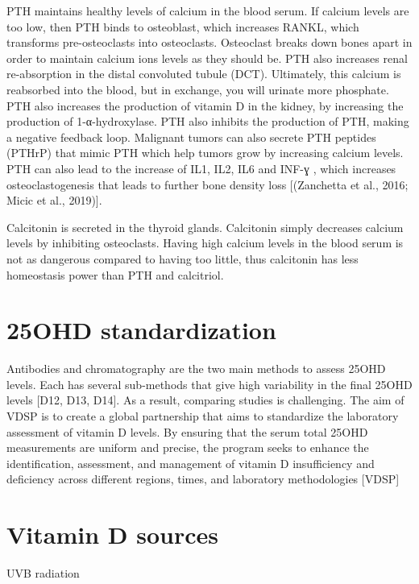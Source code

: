 PTH maintains healthy levels of calcium in the blood serum. If calcium levels are too low, then PTH binds to osteoblast, which increases RANKL, which transforms pre-osteoclasts into osteoclasts. Osteoclast breaks down bones apart in order to maintain calcium ions levels as they should be. PTH also increases renal re-absorption in the distal convoluted tubule (DCT). Ultimately, this calcium is reabsorbed into the blood, but in exchange, you will urinate more phosphate. PTH also increases the production of vitamin D in the kidney, by increasing the production of 1-α-hydroxylase. PTH also inhibits the production of PTH, making a negative feedback loop. Malignant tumors can also secrete PTH peptides (PTHrP) that mimic PTH which help tumors grow by increasing calcium levels. PTH can also lead to the increase of IL1, IL2, IL6 and INF-ɣ , which increases osteoclastogenesis that leads to further bone density loss [(Zanchetta et al., 2016; Micic et al., 2019)]. 

Calcitonin is secreted in the thyroid glands. Calcitonin simply decreases calcium levels by inhibiting osteoclasts. Having high calcium levels in the blood serum is not as dangerous compared to having too little, thus calcitonin has less homeostasis power than PTH and calcitriol. 


\section{25OHD standardization}

Antibodies and chromatography are the two main methods to assess 25OHD levels. Each has several sub-methods that give high variability in the final 25OHD levels [D12, D13, D14]. As a result, comparing studies is challenging. The aim of VDSP is to create a global partnership that aims to standardize the laboratory assessment of vitamin D levels. By ensuring that the serum total 25OHD measurements are uniform and precise, the program seeks to enhance the identification, assessment, and management of vitamin D insufficiency and deficiency across different regions, times, and laboratory methodologies [VDSP] 



\section{Vitamin D sources}


UVB radiation 

 

